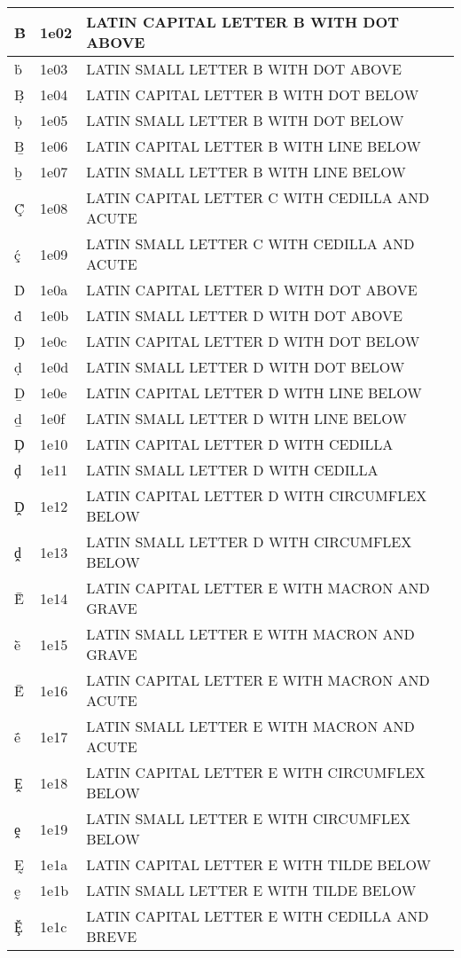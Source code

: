 \documentclass[12pt,letterpaper,openany]{book}
\begin{document}
\begin{center}
\begin{supertabular}{|m{0.25in}|m{0.5in}|m{4in}|}
Ḃ & 1e02 & LATIN CAPITAL LETTER B WITH DOT ABOVE\\\hline
ḃ & 1e03 & LATIN SMALL LETTER B WITH DOT ABOVE\\\hline
Ḅ & 1e04 & LATIN CAPITAL LETTER B WITH DOT BELOW\\\hline
ḅ & 1e05 & LATIN SMALL LETTER B WITH DOT BELOW\\\hline
Ḇ & 1e06 & LATIN CAPITAL LETTER B WITH LINE BELOW\\\hline
ḇ & 1e07 & LATIN SMALL LETTER B WITH LINE BELOW\\\hline
Ḉ & 1e08 & LATIN CAPITAL LETTER C WITH CEDILLA AND ACUTE\\\hline
ḉ & 1e09 & LATIN SMALL LETTER C WITH CEDILLA AND ACUTE\\\hline
Ḋ & 1e0a & LATIN CAPITAL LETTER D WITH DOT ABOVE\\\hline
ḋ & 1e0b & LATIN SMALL LETTER D WITH DOT ABOVE\\\hline
Ḍ & 1e0c & LATIN CAPITAL LETTER D WITH DOT BELOW\\\hline
ḍ & 1e0d & LATIN SMALL LETTER D WITH DOT BELOW\\\hline
Ḏ & 1e0e & LATIN CAPITAL LETTER D WITH LINE BELOW\\\hline
ḏ & 1e0f & LATIN SMALL LETTER D WITH LINE BELOW\\\hline
Ḑ & 1e10 & LATIN CAPITAL LETTER D WITH CEDILLA\\\hline
ḑ & 1e11 & LATIN SMALL LETTER D WITH CEDILLA\\\hline
Ḓ & 1e12 & LATIN CAPITAL LETTER D WITH CIRCUMFLEX BELOW\\\hline
ḓ & 1e13 & LATIN SMALL LETTER D WITH CIRCUMFLEX BELOW\\\hline
Ḕ & 1e14 & LATIN CAPITAL LETTER E WITH MACRON AND GRAVE\\\hline
ḕ & 1e15 & LATIN SMALL LETTER E WITH MACRON AND GRAVE\\\hline
Ḗ & 1e16 & LATIN CAPITAL LETTER E WITH MACRON AND ACUTE\\\hline
ḗ & 1e17 & LATIN SMALL LETTER E WITH MACRON AND ACUTE\\\hline
Ḙ & 1e18 & LATIN CAPITAL LETTER E WITH CIRCUMFLEX BELOW\\\hline
ḙ & 1e19 & LATIN SMALL LETTER E WITH CIRCUMFLEX BELOW\\\hline
Ḛ & 1e1a & LATIN CAPITAL LETTER E WITH TILDE BELOW\\\hline
ḛ & 1e1b & LATIN SMALL LETTER E WITH TILDE BELOW\\\hline
Ḝ & 1e1c & LATIN CAPITAL LETTER E WITH CEDILLA AND BREVE\\\hline

\end{supertabular}
\end{center}
\end{document}
